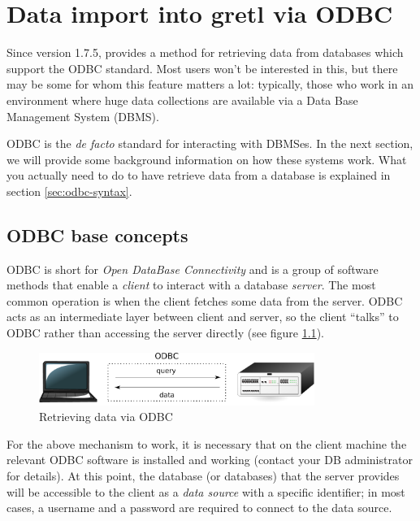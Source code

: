 \chapter{Data import into gretl via ODBC}
\label{chap:odbc}

Since version 1.7.5,  provides a method for retrieving data
from databases which support the ODBC standard. Most users
won't be interested in this, but there may be some for whom this
feature matters a lot: typically, those who work in an environment
where huge data collections are available via a Data Base Management
System (DBMS).

ODBC is the \emph{de facto} standard for interacting with DBMSes. In
the next section, we will provide some background information on how
these systems work. What you actually need to do to have 
retrieve data from a database is explained in section
\ref{sec:odbc-syntax}.

\section{ODBC base concepts}
\label{sec:odbc-base}

ODBC is short for \emph{Open DataBase Connectivity} and is a group of
software methods that enable a \emph{client} to interact with a
database \emph{server}. The most common operation is when the client
fetches some data from the server. ODBC acts as an intermediate layer
between client and server, so the client ``talks'' to ODBC rather than
accessing the server directly (see figure \ref{fig:odbc}).

\begin{figure}[htbp]
  \centering
  \includegraphics[width=0.8\textwidth]{../figures/odbc}
  \caption{Retrieving data via ODBC}
  \label{fig:odbc}
\end{figure}

For the above mechanism to work, it is necessary that on the client
machine the relevant ODBC software is installed and working (contact
your DB administrator for details). At this point, the database (or
databases) that the server provides will be accessible to the client
as a \emph{data source} with a specific identifier; in most cases, a
username and a password are required to connect to the data source.

